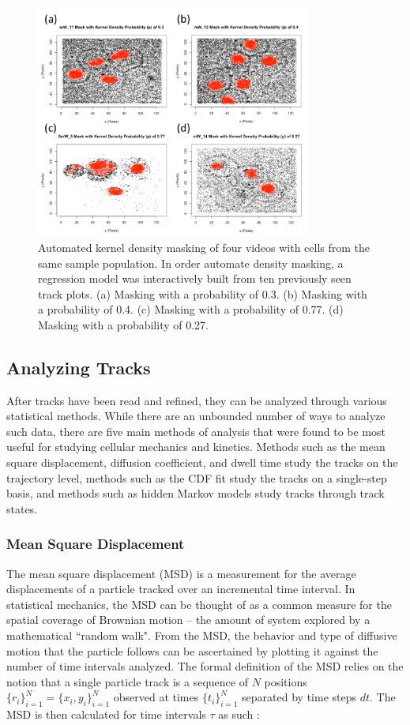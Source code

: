 \documentclass{bioinfo}
\begin{document}
\begin{figure}[!tpb]
\centerline{\includegraphics[width=90mm]{kd.png}}
\caption{Automated kernel density masking of four videos with cells from the same sample population. In order automate density masking, a regression model was interactively built from ten previously seen track plots. (a) Masking with a probability of 0.3. (b) Masking with a probability of 0.4. (c) Masking with a probability of 0.77. (d) Masking with a probability of 0.27.}\label{fig:08}
\end{figure}


\subsection{Analyzing Tracks}

After tracks have been read and refined, they can be analyzed through various statistical methods. While there are an unbounded number of ways to analyze such data, there are five main methods of analysis that were found to be most useful for studying cellular mechanics and kinetics. Methods such as the mean square displacement, diffusion coefficient, and dwell time study the tracks on the trajectory level, methods such as the CDF fit study the tracks on a single-step basis, and methods such as hidden Markov models study tracks through track states.

\subsubsection{Mean Square Displacement}


The mean square displacement (MSD) is a measurement for the average displacements of a particle tracked over an incremental time interval. In statistical mechanics, the MSD can be thought of as a common measure for the spatial coverage of Brownian motion -- the amount of system explored by a mathematical ``random walk". From the MSD, the behavior and type of diffusive motion that the particle follows can be ascertained by plotting it against the number of time intervals analyzed. The formal definition of the MSD relies on the notion that a single particle track is a sequence of $N$ positions $\big\{r_i\big\}^N_{i=1} = \big\{x_i, y_i\big\}^N_{i=1}$ observed at times $\big\{t_i\big\}^N_{i=1}$ separated by time steps $dt$. The MSD is then calculated for time intervals $\tau$ as such \citep{Vrljic}:
\end{document}
